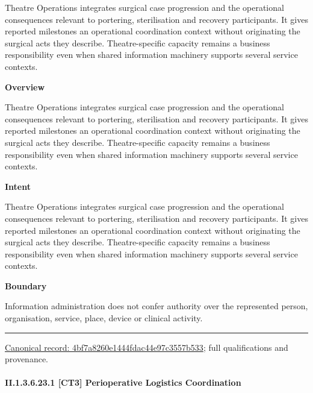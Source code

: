 Theatre Operations integrates surgical case progression and the operational consequences relevant to portering, sterilisation and recovery participants. It gives reported milestones an operational coordination context without originating the surgical acts they describe. Theatre-specific capacity remains a business responsibility even when shared information machinery supports several service contexts.



\textbf{Overview}



Theatre Operations integrates surgical case progression and the operational consequences relevant to portering, sterilisation and recovery participants. It gives reported milestones an operational coordination context without originating the surgical acts they describe. Theatre-specific capacity remains a business responsibility even when shared information machinery supports several service contexts.



\textbf{Intent}



Theatre Operations integrates surgical case progression and the operational consequences relevant to portering, sterilisation and recovery participants. It gives reported milestones an operational coordination context without originating the surgical acts they describe. Theatre-specific capacity remains a business responsibility even when shared information machinery supports several service contexts.



\textbf{Boundary}



Information administration does not confer authority over the represented person, organisation, service, place, device or clinical activity.



\medskip\hrule\medskip

{\footnotesize \href{../../../../../../../continuum/strategy/capability/4bf7a8260e1444fdac44e97c3557b533.md}{Canonical record: 4bf7a8260e1444fdac44e97c3557b533}; full qualifications and provenance.}\par
\paragraph*{II.1.3.6.23.1 [CT3] Perioperative Logistics Coordination}
\label{navigation:II.1.3.6.23.1}

